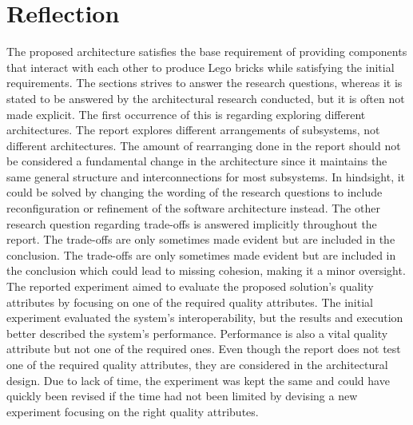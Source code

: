 \section{Reflection}
The proposed architecture satisfies the base requirement of providing components that interact with each other to produce Lego bricks while satisfying the initial requirements. The sections strives to answer the research questions, whereas it is stated to be answered by the architectural research conducted, but it is often not made explicit.
The first occurrence of this is regarding exploring different architectures. The report explores different arrangements of subsystems, not different architectures. The amount of rearranging done in the report should not be considered a fundamental change in the architecture since it maintains the same general structure and interconnections for most subsystems. In hindsight, it could be solved by changing the wording of the research questions to include reconfiguration or refinement of the software architecture instead. The other research question regarding trade-offs is answered implicitly throughout the report. The trade-offs are only sometimes made evident but are included in the conclusion. The trade-offs are only sometimes made evident but are included in the conclusion which could lead to missing cohesion, making it a minor oversight. The reported experiment aimed to evaluate the proposed solution's quality attributes by focusing on one of the required quality attributes. The initial experiment evaluated the system's interoperability, but the results and execution better described the system's performance. Performance is also a vital quality attribute but not one of the required ones. Even though the report does not test one of the required quality attributes, they are considered in the architectural design. Due to lack of time, the experiment was kept the same and could have quickly been revised if the time had not been limited by devising a new experiment focusing on the right quality attributes.